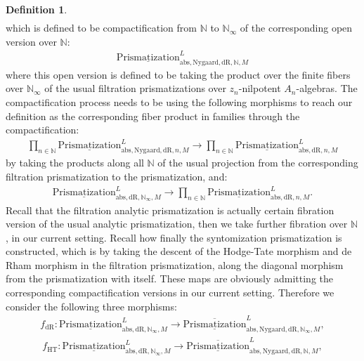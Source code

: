 \documentclass[12pt]{article}
\theoremstyle{definition}
\newtheorem{definition}{Definition}
\begin{document}
\begin{definition}
\begin{align}
\end{align}
which is defined to be compactification from $\mathbb{N}$ to $\mathbb{N}_\infty$ of the corresponding open version over $\mathbb{N}$:
\begin{align}
{\underline{\mathrm{Prismatization}}}^L_{\mathrm{abs},\mathrm{Nygaard},\mathrm{dR},\mathbb{N},M}
\end{align}
where this open version is defined to be taking the product over the finite fibers over $\mathbb{N}_\infty$ of the usual filtration prismatizations over $z_n$-nilpotent $A_n$-algebras. The compactification process needs to be using the following morphisms to reach our definition as the corresponding fiber product in families through the compactification:
\begin{align}
\prod_{n\in \mathbb{N}} {\underline{\mathrm{Prismatization}}}^L_{\mathrm{abs},\mathrm{Nygaard},\mathrm{dR},n,M}\rightarrow  \prod_{n\in \mathbb{N}} {\underline{\mathrm{Prismatization}}}^L_{\mathrm{abs},\mathrm{dR},n,M}
\end{align}
by taking the products along all $\mathbb{N}$ of the usual projection from the corresponding filtration prismatization to the prismatization, and:
\begin{align}
{\underline{\mathrm{Prismatization}}}^L_{\mathrm{abs},\mathrm{dR},\mathbb{N}_\infty,M}\rightarrow  \prod_{n\in \mathbb{N}} {\underline{\mathrm{Prismatization}}}^L_{\mathrm{abs},\mathrm{dR},n,M}.
\end{align}
Recall that the filtration analytic prismatization is actually certain fibration version of the usual analytic prismatization, then we take further fibration over $\mathbb{N}$, in our current setting. Recall how finally the syntomization prismatization is constructed, which is by taking the descent of the Hodge-Tate morphism and de Rham morphism in the filtration prismatization, along the diagonal morphism from the prismatization with itself. These maps are obviously admitting the corresponding compactification versions in our current setting. Therefore we consider the following three morphisms:
\begin{align}
f_\mathrm{dR}: {\underline{\mathrm{Prismatization}}}^L_{\mathrm{abs},\mathrm{dR},\mathbb{N}_\infty,M}\rightarrow \overline{\underline{\mathrm{Prismatization}}}^L_{\mathrm{abs},\mathrm{Nygaard},\mathrm{dR},\mathbb{N}_\infty,M},
\end{align}
\begin{align}
f_\mathrm{HT}: {\underline{\mathrm{Prismatization}}}^L_{\mathrm{abs},\mathrm{dR},\mathbb{N}_\infty,M}\rightarrow \overline{\underline{\mathrm{Prismatization}}}^L_{\mathrm{abs},\mathrm{Nygaard},\mathrm{dR},\mathbb{N},M},

\end{align}
\end{definition}
\end{document}
